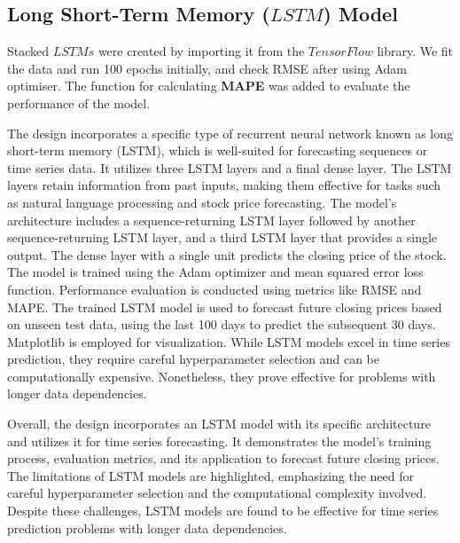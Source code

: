 \documentclass[12pt]{article}
\begin{document}
\subsection{Long Short-Term Memory ($LSTM$) Model}
Stacked $LSTMs$ were created by importing it from the $TensorFlow$ library. We fit the data and run 100 epochs initially, and check RMSE after using Adam optimiser. The function for calculating \textbf{MAPE} was added to evaluate the performance of the model.

The design incorporates a specific type of recurrent neural network known as long short-term memory (LSTM), which is well-suited for forecasting sequences or time series data. It utilizes three LSTM layers and a final dense layer. The LSTM layers retain information from past inputs, making them effective for tasks such as natural language processing and stock price forecasting. The model's architecture includes a sequence-returning LSTM layer followed by another sequence-returning LSTM layer, and a third LSTM layer that provides a single output. The dense layer with a single unit predicts the closing price of the stock. The model is trained using the Adam optimizer and mean squared error loss function. Performance evaluation is conducted using metrics like RMSE and MAPE. The trained LSTM model is used to forecast future closing prices based on unseen test data, using the last 100 days to predict the subsequent 30 days. Matplotlib is employed for visualization. While LSTM models excel in time series prediction, they require careful hyperparameter selection and can be computationally expensive. Nonetheless, they prove effective for problems with longer data dependencies.

Overall, the design incorporates an LSTM model with its specific architecture and utilizes it for time series forecasting. It demonstrates the model's training process, evaluation metrics, and its application to forecast future closing prices. The limitations of LSTM models are highlighted, emphasizing the need for careful hyperparameter selection and the computational complexity involved. Despite these challenges, LSTM models are found to be effective for time series prediction problems with longer data dependencies.
\pagebreak
\end{document}
